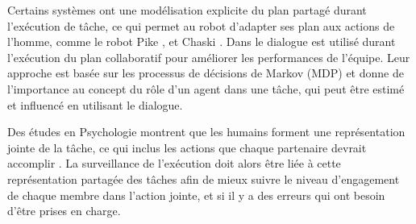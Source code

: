 \documentclass[a4paper,11pt,twoside]{StyleThese}
\begin{document}


Certains systèmes ont une modélisation explicite du plan partagé durant l'exécution de tâche, ce qui permet au robot d'adapter ses plan aux actions de l'homme, comme le robot Pike
\cite{levine2014concurrent,karpas2015robust}, et Chaski \cite{shah2011improved}.
Dans \cite{clairrobot} le dialogue est utilisé durant l'exécution du plan collaboratif pour améliorer les performances de l'équipe. Leur approche est basée sur les processus de décisions de Markov (MDP) et donne de l'importance au concept du rôle d'un agent dans une tâche, qui peut être estimé et influencé en utilisant le dialogue.

Des études en Psychologie montrent que les humains forment une représentation jointe de la tâche, ce qui inclus les actions que chaque partenaire devrait accomplir \cite{sebanz2006joint}. La surveillance de l'exécution doit alors être liée à cette représentation partagée des tâches afin de mieux suivre le niveau d'engagement de chaque membre dans l'action jointe, et si il y a des erreurs qui ont besoin d'être prises en charge.






 


\end{document}

